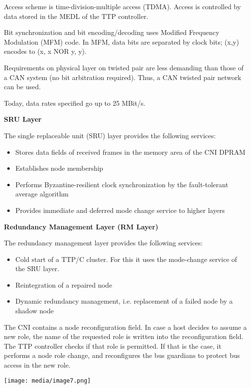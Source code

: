 Access scheme is time-division-multiple access (TDMA). Access is
controlled by data stored in the MEDL of the TTP controller.

Bit synchronization and bit encoding/decoding uses Modified Frequency
Modulation (MFM) code. In MFM, data bits are separated by clock bits;
(x,y) encodes to (x, x NOR y, y).

Requirements on physical layer on twisted pair are less demanding than
those of a CAN system (no bit arbitration required). Thus, a CAN twisted
pair network can be used.

Today, data rates specified go up to 25 MBit/s.

\textbf{SRU Layer}

The single replaceable unit (SRU) layer provides the following services:

\begin{itemize}
\item
  Stores data fields of received frames in the memory area of the CNI
  DPRAM
\item
  Establishes node membership
\item
  Performs Byzantine-resilient clock synchronization by the
  fault-tolerant average algorithm
\item
  Provides immediate and deferred mode change service to higher layers
\end{itemize}

\textbf{Redundancy Management Layer (RM Layer)}

The redundancy management layer provides the following services:

\begin{itemize}
\item
  Cold start of a TTP/C cluster. For this it uses the mode-change
  service of the SRU layer.
\item
  Reintegration of a repaired node
\item
  Dynamic redundancy management, i.e. replacement of a failed node by a
  shadow node
\end{itemize}

The CNI contains a node reconfiguration field. In case a host decides to
assume a new role, the name of the requested role is written into the
reconfiguration field. The TTP controller checks if that role is
permitted. If that is the case, it performs a node role change, and
reconfigures the bus guardians to protect bus access in the new role.

\texttt{[image: media/image7.png]}

